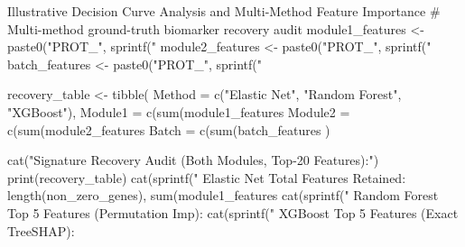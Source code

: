 \documentclass[11pt,oneside]{book}
\begin{document}
\begin{rchunk}{Illustrative Decision Curve Analysis and Multi-Method Feature Importance}
# Multi-method ground-truth biomarker recovery audit
module1_features <- paste0("PROT_", sprintf("%
module2_features <- paste0("PROT_", sprintf("%
batch_features   <- paste0("PROT_", sprintf("%

recovery_table <- tibble(
  Method  = c("Elastic Net", "Random Forest", "XGBoost"),
  Module1 = c(sum(module1_features %
  Module2 = c(sum(module2_features %
  Batch   = c(sum(batch_features %
)

cat("\nBiomarker Signature Recovery Audit (Both Modules, Top-20 Features):\n")
print(recovery_table)
cat(sprintf("  Elastic Net Total Features Retained: %
            length(non_zero_genes), sum(module1_features %
cat(sprintf("  Random Forest Top 5 Features (Permutation Imp): %
cat(sprintf("  XGBoost Top 5 Features (Exact TreeSHAP):        %
\end{rchunk}
\end{document}
